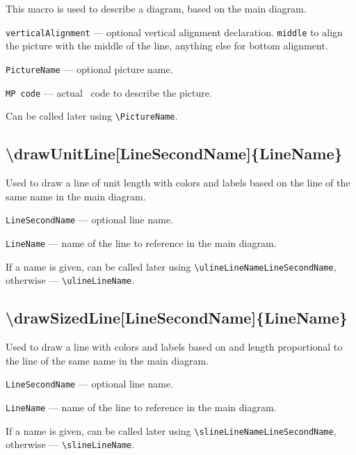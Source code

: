 \documentclass{ltxdoc}
\begin{document}
	This macro is used to describe a diagram, based on the main diagram.

	\texttt{verticalAlignment} — optional vertical alignment declaration. \texttt{middle} to align the picture with the middle of the line, anything else for bottom alignment.

	\texttt{PictureName} — optional picture name.

	\texttt{MP code} — actual \METAPOST\ code to describe the picture.
	
	Can be called later using \texttt{\textbackslash PictureName}.


\subsection{\textbackslash drawUnitLine[LineSecondName]\{LineName\}}

	Used to draw a line of unit length with colors and labels based on the line of the same name in the main diagram.

	\texttt{LineSecondName} — optional line name.
	
	\texttt{LineName} — name of the line to reference in the main diagram. 

	If a name is given, can be called later using \texttt{\textbackslash ulineLineNameLineSecondName}, otherwise — \texttt{\textbackslash ulineLineName}. 
	

\subsection{\textbackslash drawSizedLine[LineSecondName]\{LineName\}}

	Used to draw a line with colors and labels based on and length proportional to the line of the same name in the main diagram.

	\texttt{LineSecondName} — optional line name. 
	
	\texttt{LineName} — name of the line to reference in the main diagram. 
	
	If a name is given, can be called later using \texttt{\textbackslash slineLineNameLineSecondName}, otherwise — \texttt{\textbackslash slineLineName}. 




\end{document}
